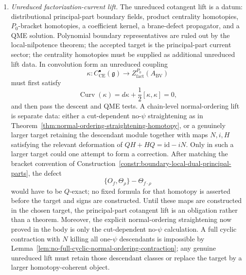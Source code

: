 \begin{enumerate}
  finite-row habitat contains no such \(B^2_{02,20}\): the desired target
  \((0,0,-1)^T\) is not in the image of \(A_D^2\), because
  \[
    \widetilde\lambda_{02,\mathfrak b}A_D^2=0,\qquad
    \widetilde\lambda_{02,\mathfrak b}((0,0,-1)^T)=-1 .
  \]
  The next construction target is therefore a genuine scalar-zero
  local-functional column \(A_B^2=(0,0,-1)^T\), not a relabelling of the
  source primitive.  In a tower the named Bianchi transport cocycle is
  \[
    \Delta^1_{M,N}
    =
    -\pi_{M,N}\mathfrak b^M+\mathfrak b^N .
  \]
  A compatible family \(B^M\) would kill it by
  \[
    \Delta^1_{M,N}
    =
    d_{\mathrm{ns},N}(\pi_{M,N}B^M-B^N).
  \]
  Thus the tower must first kill the \(H^1\) class of
  \(\Delta^1_{M,N}\); after a choice of primitive, it must also kill the
  resulting secondary \(\varprojlim^1H^0\) class.  The tested finite
  routes do not close the row.

  \item \emph{Unreduced factorization-current lift.}
	  The unreduced cotangent lift is a datum:
	  distributional principal-part boundary fields, product centrality
	  homotopies, \(P_0\)-bracket homotopies, a coefficient kernel, a
	  brane-defect propagator, and a QME solution.  Polynomial boundary
	  representatives are ruled out by the local-nilpotence theorem; the
	  accepted target is the principal-part current sector; the centrality
	  homotopies must be supplied as additional unreduced lift data.  In
	  convolution form an unreduced coupling
	  \[
	    \kappa\colon C^\bullet_{\mathrm{CE}}(\mathfrak g)
	    \longrightarrow Z^{P_0}_{\mathrm{fact}}(A_{\mathrm{BV}})
	  \]
	  must first satisfy
	  \[
	    \operatorname{Curv}(\kappa)
	    =d\kappa+\frac12[\kappa,\kappa]=0,
	  \]
		  and then pass the descent and QME tests.  A chain-level
		  normal-ordering lift is separate data: either a cut-dependent
		  no-\(\psi\) straightening as in
		  Theorem~\ref{thm:normal-ordering-straightening-homotopy}, or a
		  genuinely larger target retaining the descendant module together with
		  maps \(N,i,H\) satisfying the relevant deformation of
		  \(QH+HQ=\mathrm{id}-iN\).  Only in such a larger target could one
		  attempt to form a correction.  After matching the bracket convention of
		  Construction~\ref{constr:boundary-local-dual-principal-parts}, the
		  defect
		  \[
		    \{O_f,\Theta_\rho\}-\Theta_{f\cdot\rho}
		  \]
		  would have to be \(Q\)-exact; no fixed formula for that homotopy is
		  asserted before the target and signs are constructed.
  Until these maps are constructed in the chosen target, the
  principal-part cotangent lift is an obligation rather than a theorem.
  Moreover, the explicit normal-ordering straightening now proved in the
  body is only the cut-dependent no-\(\psi\) calculation.  A full cyclic
  contraction with \(N\) killing all one-\(\psi\) descendants is
  impossible by Lemma~\ref{lem:no-full-cyclic-normal-ordering-contraction};
  any genuine unreduced lift must retain those descendant classes or
  replace the target by a larger homotopy-coherent object.


\end{enumerate}
